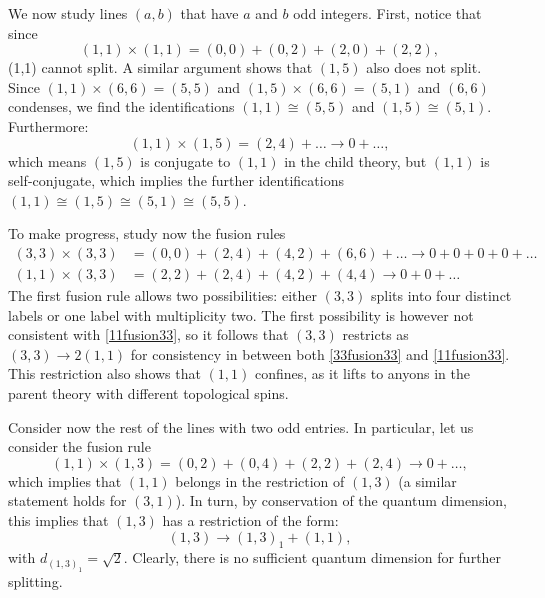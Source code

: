 \documentclass[11pt]{article}
\numberwithin{equation}{section}
\begin{document}
We now study lines $(a,b)$ that have $a$ and $b$ odd integers. First, notice that since
\begin{equation}
    (1,1) \times (1,1) = (0,0) + (0,2) + (2,0) + (2,2), \label{11fusion11}
\end{equation}
(1,1) cannot split. A similar argument shows that $(1,5)$ also does not split. Since $(1,1) \times (6,6) = (5,5)$ and $(1,5) \times (6,6) = (5,1)$ and $(6,6)$ condenses, we find the identifications $(1,1) \cong (5,5)$ and $(1,5) \cong (5,1)$. Furthermore:
\begin{equation}
    (1,1) \times (1,5) = (2,4) + \ldots \longrightarrow 0 + \ldots,
\end{equation}
which means $(1,5)$ is conjugate to $(1,1)$ in the child theory, but $(1,1)$ is self-conjugate, which implies the further identifications $(1,1) \cong (1,5) \cong (5,1) \cong (5,5)$.

To make progress, study now the fusion rules
\begin{align}
    (3,3) \times (3,3) &= (0,0) + (2,4) + (4,2) + (6,6) + \ldots \longrightarrow 0+0+0+0+\ldots \label{33fusion33} \\[0.3cm] 
    (1,1) \times (3,3) &= (2,2) + (2,4) + (4,2) + (4,4) \longrightarrow 0+0+\ldots \label{11fusion33}
\end{align}
The first fusion rule allows two possibilities: either $(3,3)$ splits into four distinct labels or one label with multiplicity two. The first possibility is however not consistent with \eqref{11fusion33}, so it follows that $(3,3)$ restricts as $(3,3) \to 2(1,1)$ for consistency in between both \eqref{33fusion33} and \eqref{11fusion33}. This restriction also shows that $(1,1)$ confines, as it lifts to anyons in the parent theory with different topological spins.

Consider now the rest of the lines with two odd entries. In particular, let us consider the fusion rule
\begin{equation}
    (1,1) \times (1,3) = (0,2) + (0,4) + (2,2) + (2,4) \longrightarrow 0 + \ldots,
\end{equation}
which implies that $(1,1)$ belongs in the restriction of $(1,3)$ (a similar statement holds for $(3,1)$). In turn, by conservation of the quantum dimension, this implies that $(1,3)$ has a restriction of the form:
\begin{equation}
    (1,3) \longrightarrow (1,3)_{1} + (1,1),
\end{equation}
with $d_{(1,3)_{1}} = \sqrt{2}$. Clearly, there is no sufficient quantum dimension for further splitting.
\end{document}
